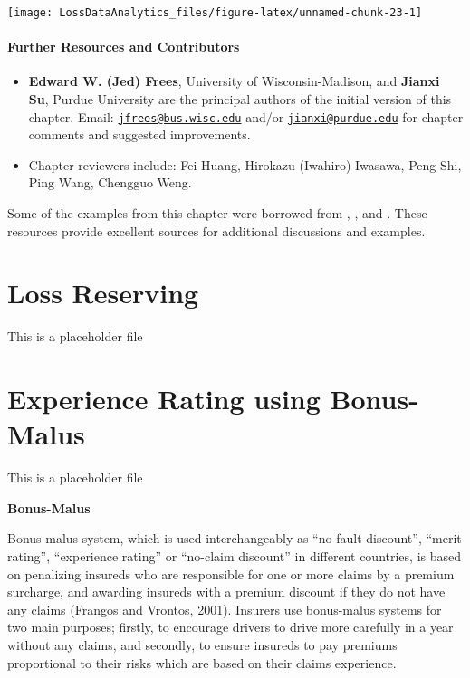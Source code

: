 \documentclass[]{book}
\providecommand{\tightlist}{%
  \setlength{\itemsep}{0pt}\setlength{\parskip}{0pt}}
\theoremstyle{definition}
\theoremstyle{definition}
\theoremstyle{definition}
\theoremstyle{remark}
\begin{document}
\begin{center}\texttt{[image: LossDataAnalytics\_files/figure-latex/unnamed-chunk-23-1]} \end{center}

\subsubsection*{Further Resources and
Contributors}\label{further-resources-and-contributors}

\begin{itemize}
\tightlist
\item
  \textbf{Edward W. (Jed) Frees}, University of Wisconsin-Madison, and
  \textbf{Jianxi Su}, Purdue University are the principal authors of the
  initial version of this chapter. Email:
  \href{mailto:jfrees@bus.wisc.edu}{\nolinkurl{jfrees@bus.wisc.edu}}
  and/or \href{mailto:jianxi@purdue.edu}{\nolinkurl{jianxi@purdue.edu}}
  for chapter comments and suggested improvements.
\item
  Chapter reviewers include: Fei Huang, Hirokazu (Iwahiro) Iwasawa, Peng
  Shi, Ping Wang, Chengguo Weng.
\end{itemize}

Some of the examples from this chapter were borrowed from
\citet{clark1996basics}, \citet{klugman2012}, and
\citet{bahnemann2015distributions}. These resources provide excellent
sources for additional discussions and examples.

\chapter{Loss Reserving}\label{C:LossReserves}

This is a placeholder file

\chapter{Experience Rating using Bonus-Malus}\label{C:BonusMalus}

This is a placeholder file

\textbf{Bonus-Malus}

Bonus-malus system, which is used interchangeably as ``no-fault
discount'', ``merit rating'', ``experience rating'' or ``no-claim
discount'' in different countries, is based on penalizing insureds who
are responsible for one or more claims by a premium surcharge, and
awarding insureds with a premium discount if they do not have any claims
(Frangos and Vrontos, 2001). Insurers use bonus-malus systems for two
main purposes; firstly, to encourage drivers to drive more carefully in
a year without any claims, and secondly, to ensure insureds to pay
premiums proportional to their risks which are based on their claims
experience.
\end{document}
